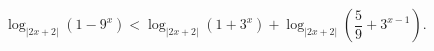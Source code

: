 \begin{ex}[type=inequality]
	\begin{condition}
		$\log_{|2x + 2|}(1 - 9^x)<\log_{|2x +2|}(1 + 3^x) + \log_{|2x + 2|}\left(\dfrac{5}{9} + 3^{x - 1}\right)  .$
	\end{condition}
\end{ex}